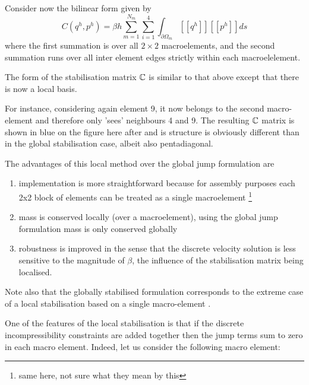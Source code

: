 \begin{center}

\end{center}

Consider now the bilinear form given by
\[
C(q^h,p^h) = \beta h \sum_{m=1}^{N_m} \sum_{i=1}^4 \int_{\partial \Omega_m}[[ q^h ]]  [[p^h ]] ds
\]
where the first summation is over all $2\times 2$ macroelements,
and the second summation runs over all inter element edges strictly within 
each macroelelement. 

The form of the stabilisation matrix ${\mathbb{C}}$ 
is similar to that above except that there is now a
local basis.

For instance, considering again element 9, it now belongs to the second macro-element
and therefore only 'sees' neighbours 4 and 9.
The resulting ${\mathbb{C}}$ matrix is shown in blue on the figure here after and 
is structure is obviously different than in the global stabilisation case, albeit 
also pentadiagonal. 


The advantages of this local method over the global jump formulation are 
\begin{enumerate}
\item implementation is more straightforward because for assembly purposes each 2x2 block
of elements can be treated as a single macroelement \footnote{same here, not sure what they mean by this}
\item mass is conserved locally (over a macroelement), using the global jump formulation
mass is only conserved globally
\item robustness is improved in the sense that the discrete velocity solution is less sensitive 
to the magnitude of $\beta$, the influence of the stabilisation matrix being localised.
\end{enumerate}

Note also that the globally stabilised formulation corresponds to the 
extreme case of a local stabilisation based on a single macro-element \cite{grsa}.

One of the features of the local stabilisation is that if the discrete incompressibility 
constraints are added together then the jump terms sum to zero in each macro element.
Indeed, let us consider the following macro element: 

\begin{center}

\end{center}

